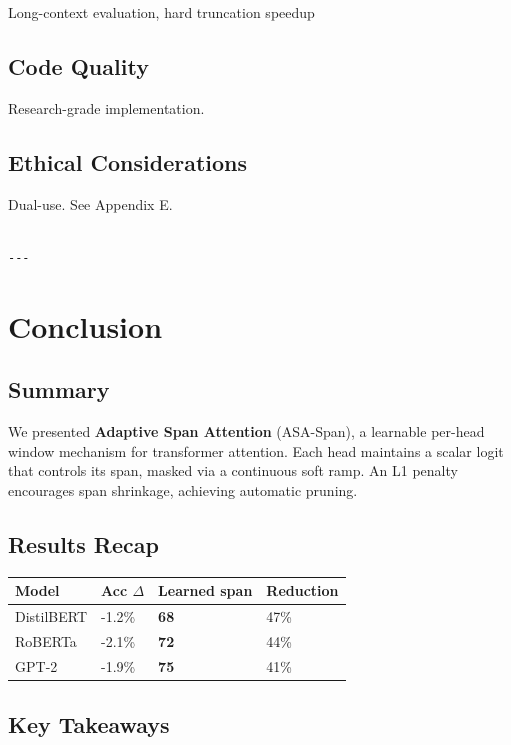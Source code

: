 Long-context evaluation, hard truncation speedup

\subsection{Code Quality}

Research-grade implementation.

\subsection{Ethical Considerations}

Dual-use. See Appendix E.
\begin{lstlisting}

---
\end{lstlisting}


\section{Conclusion}

\subsection{Summary}

We presented \textbf{Adaptive Span Attention} (ASA-Span), a learnable per-head 
window mechanism for transformer attention. Each head maintains a scalar 
logit that controls its span, masked via a continuous soft ramp. An L1 penalty 
encourages span shrinkage, achieving automatic pruning.

\subsection{Results Recap}

\begin{table}[H]
\centering
\small
\begin{tabular}{llll}
\toprule
\textbf{Model} & \textbf{Acc $\Delta$} & \textbf{Learned span} & \textbf{Reduction} \\
\midrule
DistilBERT & -1.2\% & \textbf{68} & 47\% \\
RoBERTa & -2.1\% & \textbf{72} & 44\% \\
GPT-2 & -1.9\% & \textbf{75} & 41\% \\
\bottomrule
\end{tabular}
\end{table}

\subsection{Key Takeaways}

